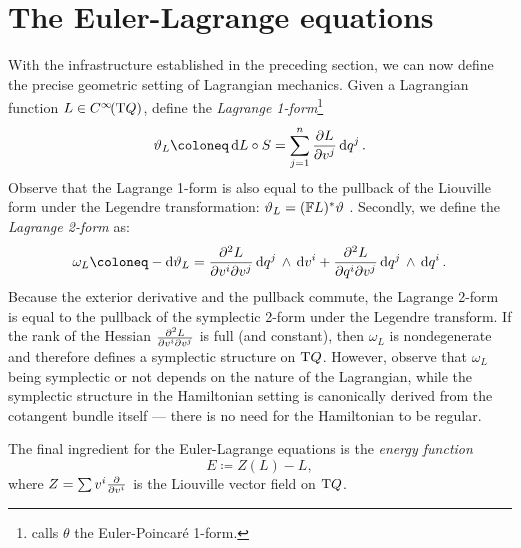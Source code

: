 \section{The Euler-Lagrange equations} 
With the infrastructure established in the preceding section, we can now define the precise geometric setting of Lagrangian mechanics. Given a Lagrangian function \(L \in C^\infty\!\qty(\mathrm{T}Q)\), define the \emph{Lagrange 1-form}\footnote
{\citet{Carinena1990} calls \(\theta\) the Euler-Poincaré 1-form.}
\begin{equation}
    \theta_L \coloneq \dd{L} \circ S = \sum_{j=1}^n \pdv{L}{v^j}\dd{q^j}.
\end{equation}
Observe that the Lagrange 1-form is also equal to the pullback of the Liouville form under the Legendre transformation: \(\vartheta_L = (\mathbb{F}L)^* \vartheta\) \cite{Abraham1978}.
Secondly, we define the \emph{Lagrange 2-form} as: \cite{Abraham1978,Carinena1990}
\begin{equation}
    \omega_L \coloneq - \dd{\theta}_L = \pdv[2]{L}{v^i}{v^j}\wedgep{\dd{q^j}}{\dd{v^i}} + \pdv[2]{L}{q^i}{v^j}\wedgep{\dd{q^j}}{\dd{q^i}}.
\end{equation}
Because the exterior derivative and the pullback commute, the Lagrange 2-form is equal to the pullback of the symplectic 2-form under the Legendre transform. If the rank of the Hessian \( \pdv[2]{L}{v^i}{v^j}\) is full (and constant), then \(\omega_L\) is nondegenerate and therefore defines a symplectic structure on \(\mathrm{T}Q\). However, observe that \(\omega_L\) being symplectic or not depends on the nature of the Lagrangian, while the symplectic structure in the Hamiltonian setting is canonically derived from the cotangent bundle itself --- there is no need for the Hamiltonian to be regular.

The final ingredient for the Euler-Lagrange equations is the \emph{energy function}
\begin{equation}
     E \coloneq Z(L) - L,
\end{equation}
where \(Z = \sum v^i \pdv{}{v^i}\) is the Liouville vector field on \(\mathrm{T}Q\).

